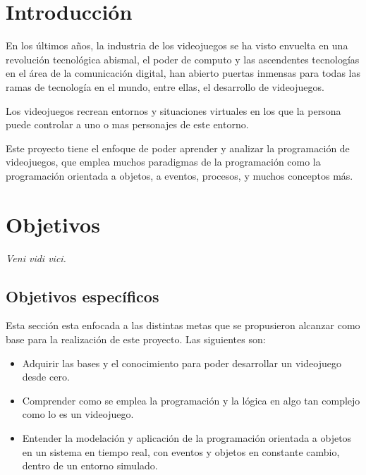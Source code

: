 \documentclass[12pt,letterpaper]{report}
\begin{document}
\chapter{Introducción} %

En los últimos años, la industria de los videojuegos se ha visto envuelta en una revolución tecnológica abismal, el poder de computo y las ascendentes tecnologías en el área de la comunicación digital, han abierto puertas inmensas para todas las ramas de tecnología en el mundo, entre ellas, el desarrollo de videojuegos.

Los videojuegos recrean entornos y situaciones virtuales en los que la persona puede controlar a uno o mas personajes de este entorno. 

Este proyecto tiene el enfoque de poder aprender y analizar la programación de videojuegos, que emplea muchos paradigmas de la programación como la programación orientada a objetos, a eventos, procesos, y muchos conceptos más. \cite{Inventa}


%
%
%
%
%

\chapter{Objetivos}
\textit{Veni vidi vici.}

\section{Objetivos específicos}

Esta sección esta enfocada a las distintas metas que se propusieron alcanzar como base para la realización de este proyecto. Las siguientes son:

\begin{itemize}

\item Adquirir las bases y el conocimiento para poder desarrollar un videojuego desde cero.

\item Comprender como se emplea la programación y la lógica en algo tan complejo como lo es un videojuego.

\item Entender la modelación y aplicación de la programación orientada a objetos en un sistema en tiempo real, con eventos y objetos en constante cambio, dentro de un entorno simulado.

\end{itemize}
\end{document}
